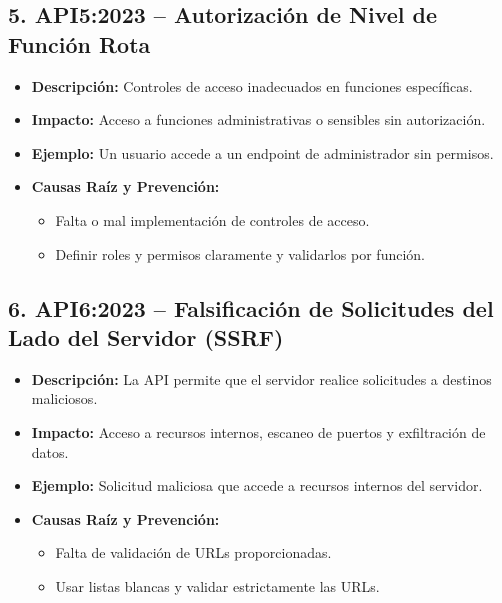 \documentclass[a4paper,12pt]{article}
\begin{document}
\subsection{5. API5:2023 – Autorización de Nivel de Función Rota}

\begin{itemize}
    \item \textbf{Descripción:} Controles de acceso inadecuados en funciones específicas.
    \item \textbf{Impacto:} Acceso a funciones administrativas o sensibles sin autorización.
    \item \textbf{Ejemplo:} Un usuario accede a un endpoint de administrador sin permisos.
    \item \textbf{Causas Raíz y Prevención:}
    \begin{itemize}
        \item Falta o mal implementación de controles de acceso.
        \item Definir roles y permisos claramente y validarlos por función.
    \end{itemize}
\end{itemize}

\subsection{6. API6:2023 – Falsificación de Solicitudes del Lado del Servidor (SSRF)}

\begin{itemize}
    \item \textbf{Descripción:} La API permite que el servidor realice solicitudes a destinos maliciosos.
    \item \textbf{Impacto:} Acceso a recursos internos, escaneo de puertos y exfiltración de datos.
    \item \textbf{Ejemplo:} Solicitud maliciosa que accede a recursos internos del servidor.
    \item \textbf{Causas Raíz y Prevención:}
    \begin{itemize}
        \item Falta de validación de URLs proporcionadas.
        \item Usar listas blancas y validar estrictamente las URLs.
    \end{itemize}
\end{itemize}
\end{document}
